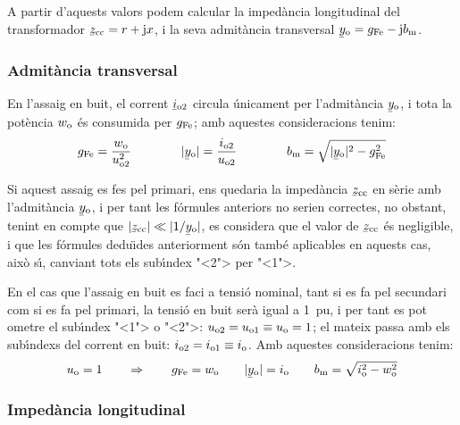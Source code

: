 A partir d'aquests valors podem calcular la imped\`{a}ncia longitudinal
del transformador $\cmplx{z}\ped{cc}=r+\ju x$, i la seva admit\`{a}ncia
transversal $\cmplx{y}\ped{o}=g\ped{Fe}-\ju b\ped{m}$.

\subsubsection{Admit\`{a}ncia transversal}

En l'assaig en buit, el corrent $\cmplx{i}\ped{o2}$ circula
\'{u}nicament per l'admit\`{a}ncia $\cmplx{y}\ped{o}$, i tota la pot\`{e}ncia
$w_\mathrm{o}$ \'{e}s consumida per $g_\mathrm{Fe}$; amb aquestes consideracions
tenim:
\begin{equation}
    g\ped{Fe} = \frac{w\ped{o}}{u\ped{o2}^2} \qquad\qquad
    |\cmplx{y}\ped{o}| = \frac{i\ped{o2}}{u\ped{o2}}
    \qquad\qquad
    b\ped{m} = \sqrt{|\cmplx{y}\ped{o}|^2 - g\ped{Fe}^2}
\end{equation}

Si aquest assaig es fes pel primari, ens quedaria la imped\`{a}ncia
$\cmplx{z}\ped{cc}$ en s\`{e}rie amb l'admit\`{a}ncia $\cmplx{y}\ped{o}$, i
per tant les f\'{o}rmules anteriors no serien correctes, no obstant,
tenint en compte que $|\cmplx{z}\ped{cc}| \ll |1/\cmplx{y}\ped{o}|$,
es  considera que el valor de $\cmplx{z}\ped{cc}$ \'{e}s negligible, i
que les f\'{o}rmules dedu\"{\i}des anteriorment s\'{o}n tamb\'{e} aplicables en
aquests cas, aix\`{o} s\'{\i}, canviant tots els sub\'{\i}ndex {"<}2{">} per {"<}1{">}.

En el cas que l'assaig en buit es faci a tensi\'{o} nominal, tant  si es
fa pel secundari com si es fa pel primari, la tensi\'{o} en buit ser\`{a}
igual a \SI{1}{pu}, i per tant es pot ometre el sub\'{\i}ndex {"<}1{">} o {"<}2{">}:
$u_\mathrm{o2} = u_\mathrm{o1} \equiv u_\mathrm{o} = 1$; el mateix passa amb els
sub\'{\i}ndexs del corrent en buit: $i_\mathrm{o2} = i_\mathrm{o1} \equiv
i_\mathrm{o}$. Amb aquestes consideracions tenim:
\begin{equation}
    u\ped{o} = 1 \qquad \Rightarrow \qquad g\ped{Fe} = w\ped{o} \qquad
    |\cmplx{y}\ped{o}| = i\ped{o} \qquad
    b\ped{m} = \sqrt{i\ped{o}^2 - w\ped{o}^2}
    \label{eq:assaig-buit-nomianl}
\end{equation}

\subsubsection{Imped\`{a}ncia longitudinal}

